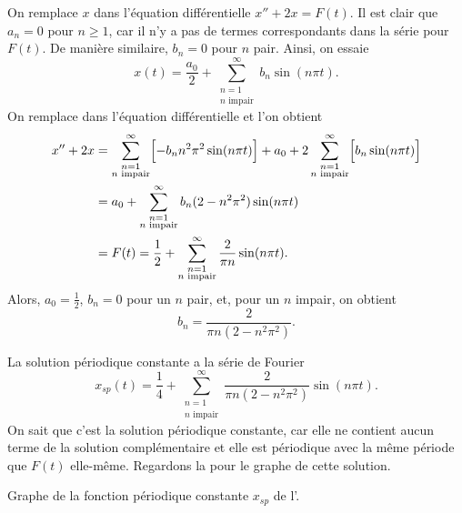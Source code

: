 \begin{example}
On remplace $x$ dans l'équation différentielle $x''+2x = F(t)$.
Il est clair que $a_n = 0$ pour $n \geq 1$, car il n'y a pas de termes correspondants
dans la série pour $F(t)$.
De manière similaire, $b_n = 0$ pour $n$ pair.  Ainsi, on essaie
\begin{equation*}
x(t) = \frac{a_0}{2} +
\sum_{\substack{n=1 \\ n \text{ impair}}}^\infty
b_n \sin (n \pi t) .
\end{equation*}
On remplace dans l'équation différentielle et l'on obtient 
\begin{equation*}
\begin{split}
x'' + 2 x & =
\sum_{\substack{n=1 \\ n \text{ impair}}}^\infty
\Bigl[ - b_n n^2 \pi^2 \sin (n \pi t) \Bigr] + 
a_0 +
2
\sum_{\substack{n=1 \\ n \text{ impair}}}^\infty
\Bigl[ b_n \sin (n \pi t) \Bigr]
\\
& =
a_0 +
\sum_{\substack{n=1 \\ n \text{ impair}}}^\infty
b_n (2 - n^2 \pi^2 ) \sin (n \pi t)
\\
& =
F(t) = \frac{1}{2} + \sum_{\substack{n=1 \\ n \text{ impair}}}^\infty
\frac{2}{\pi n} \sin (n \pi t) .
\end{split}
\end{equation*}
Alors, $a_0 = \frac{1}{2}$, $b_n = 0$ pour un $n$ pair, et, pour un $n$ impair, on obtient 
\begin{equation*}
b_n = 
\frac{2}{\pi n (2 - n^2 \pi^2 )} .
\end{equation*}

La solution périodique constante a la série de Fourier
\begin{equation*}
x_{sp}(t) = \frac{1}{4} + \sum_{\substack{n=1 \\ n \text{ impair}}}^\infty
\frac{2}{\pi n (2 - n^2 \pi^2 )}
\sin (n \pi t) .
\end{equation*}
On sait que c'est la solution périodique constante, car elle ne contient aucun terme
de la solution complémentaire et elle est périodique avec la même période que
$ F (t) $ elle-même. Regardons la  pour le graphe de cette solution.  %
\begin{myfig}
\capstart
{}
\caption{Graphe de la fonction périodique constante  $x_{sp}$ de l'.
\label{afs:steadyexfig}}
\end{myfig}
\end{example}

